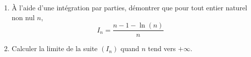 \documentclass[10pt]{article}
\begin{document}
\begin{enumerate}
		Recopier et compléter ce script afin qu'il réponde au problème posé.
		
		\item À l'aide d'une intégration par parties, démontrer que pour tout entier naturel non nul $n$,
		\[I_{n}=\dfrac{n-1-\ln (n)}{n}\]
		
		\item Calculer la limite de la suite $(I_{n})$ quand $n$ tend vers $+\infty$.
	\end{enumerate}
\end{document}
